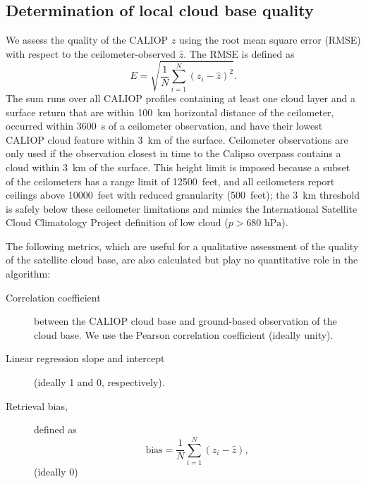 \documentclass[essd,manuscript]{copernicus}\usepackage[]{graphicx}\usepackage[]{color}
\newcommand\CBH{\ensuremath{z}}
\begin{document}
\subsection{Determination of local cloud base quality}
\label{sec:algorithm:qual}
We assess the quality of the CALIOP \CBH{} using the root mean square error
(RMSE) with respect to the
ceilometer-observed $\hat{z}$.  The RMSE is defined as
\begin{equation}
  \label{eq:rmse}
  E = \sqrt{\frac{1}{N}\sum\limits_{i = 1}^{N}\left(z_i - \hat{z}\right)^2}.
\end{equation}
The sum runs over all CALIOP profiles containing at least one cloud layer and a
surface return that are within 100~km horizontal distance of the ceilometer,
occurred within 3600~s of a ceilometer observation, and have their lowest CALIOP
cloud feature within 3~km of the surface.  Ceilometer observations are only used
if the observation closest in time to the Calipso overpass contains a cloud
within 3~km of the surface.  This height limit is imposed because a subset of
the ceilometers has a range limit of 12500~feet, and all ceilometers report
ceilings above 10000~feet with reduced granularity (500~feet); the 3~km
threshold is safely below these ceilometer limitations and mimics the
International Satellite Cloud Climatology Project \citep[ISCCP,][]{Rossow1999}
definition of low cloud ($p > 680\text{ hPa}$).

The following metrics, which are useful for a qualitative assessment of the
quality of the satellite cloud base, are also calculated but play no
quantitative role in the algorithm:
\begin{description}
\item[Correlation coefficient] between the CALIOP cloud base and ground-based
  observation of the cloud base.  We use the Pearson correlation coefficient
  (ideally unity).  
\item[Linear regression slope and intercept] (ideally 1 and 0, respectively).  
\item[Retrieval bias,] defined as
  \begin{equation}
    \label{eq:bias}
    \mbox{bias} = \frac{1}{N}\sum\limits_{i = 1}^{N}\left(z_i - \hat{z}\right),
  \end{equation}(ideally 0)
\end{description}
\end{document}
